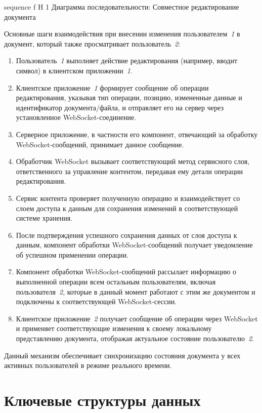 	{sequence}
	{f}
	{H}
	{1\textwidth}
	{Диаграмма последовательности: Совместное редактирование документа}

Основные шаги взаимодействия при внесении изменения пользователем~\textit{1} в документ, который также просматривает пользователь~\textit{2}:

\begin{enumerate}
    \item Пользователь~\textit{1} выполняет действие редактирования (например, вводит символ) в клиентском приложении~\textit{1}.
    \item Клиентское приложение~\textit{1} формирует сообщение об операции редактирования, указывая тип операции, позицию, измененные данные и идентификатор документа/файла, и отправляет его на сервер через установленное WebSocket-соединение.
    \item Серверное приложение, в частности его компонент, отвечающий за обработку WebSocket-сообщений, принимает данное сообщение.
    \item Обработчик WebSocket вызывает соответствующий метод сервисного слоя, ответственного за управление контентом, передавая ему детали операции редактирования.
    \item Сервис контента проверяет полученную операцию и взаимодействует со слоем доступа к данным для сохранения изменений в соответствующей системе хранения.
    \item После подтверждения успешного сохранения данных от слоя доступа к данным, компонент обработки WebSocket-сообщений получает уведомление об успешном применении операции.
    \item Компонент обработки WebSocket-сообщений рассылает информацию о выполненной операции всем остальным пользователям, включая пользователя~\textit{2}, которые в данный момент работают с этим же документом и подключены к соответствующей WebSocket-сессии.
    \item Клиентское приложение~\textit{2} получает сообщение об операции через WebSocket и применяет соответствующие изменения к своему локальному представлению документа, отображая актуальное состояние пользователю~\textit{2}.
\end{enumerate}

Данный механизм обеспечивает синхронизацию состояния документа у всех активных пользователей в режиме реального времени.

\section{Ключевые структуры данных}

